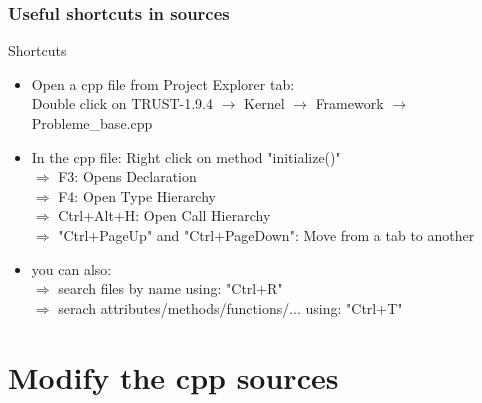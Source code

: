 \documentclass[10pt, hyperref={unicode=true,pdfusetitle, bookmarks=true,bookmarksnumbered=false,bookmarksopen=false, breaklinks=false,pdfborder={0 0 1},backref=true,colorlinks=true,linkcolor=darkblue,pageanchor, urlcolor=darkblue}]{beamer}
\begin{document}
\begin{frame}
\frametitle{Useful shortcuts in sources}

\begin{exampleblock}{Shortcuts}
\vspace{0.2cm}
\begin{itemize} 
\item Open a cpp file from Project Explorer tab: \\
  Double click on TRUST-1.9.4 $\rightarrow$ Kernel $\rightarrow$ Framework $\rightarrow$ Probleme\_base.cpp \\ \vspace{0.2cm}
\item In the cpp file: Right click on method "initialize()" \\
  $\Rightarrow$ F3: Opens Declaration \\
  $\Rightarrow$ F4: Open Type Hierarchy \\
  $\Rightarrow$ Ctrl+Alt+H: Open Call Hierarchy \\
  $\Rightarrow$ "Ctrl+PageUp" and "Ctrl+PageDown": Move from a tab to another
\item you can also: \\
  $\Rightarrow$ search files by name using: "Ctrl+R" \\
  $\Rightarrow$ serach attributes/methods/functions/... using: "Ctrl+T"
\end{itemize}
\end{exampleblock}

\end{frame}


\section{{\bf{Modify the cpp sources}}}
\end{document}
